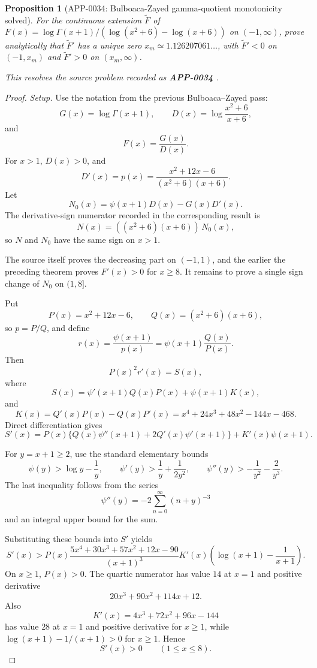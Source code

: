 \documentclass[11pt]{article}
\numberwithin{equation}{section}
\newtheorem{proposition}[theorem]{Proposition}
\theoremstyle{definition}
\theoremstyle{remark}
\newcommand{\1}{\mathbf 1}
\begin{document}
\begin{proposition}[APP-0034: Bulboaca-Zayed gamma-quotient monotonicity solved]
\label{res:bulboaca-zayed-gamma-quotient-full-monotonicity}
For the continuous extension \(\widetilde F\) of \(F(x)=\log\Gamma(x+1)/(\log(x^2+6)-\log(x+6))\) on \((-1,\infty)\), prove analytically that \(\widetilde F'\) has a unique zero \(x_m\simeq1.126207061\ldots\), with \(\widetilde F'<0\) on \((-1,x_m)\) and \(\widetilde F'>0\) on \((x_m,\infty)\).

This resolves the source problem recorded as \textbf{APP-0034} \cite{bulboaca-zayed-gamma}.
\end{proposition}

\begin{proof}
\emph{Setup.}
Use the notation from the previous Bulboaca--Zayed pass:
\[
G(x)=\log\Gamma(x+1),\qquad
D(x)=\log\frac{x^2+6}{x+6},
\]
and
\[
F(x)=\frac{G(x)}{D(x)}.
\]
For \(x>1\), \(D(x)>0\), and
\[
D'(x)=p(x)=\frac{x^2+12x-6}{(x^2+6)(x+6)}.
\]
Let
\[
N_0(x)=\psi(x+1)D(x)-G(x)D'(x).
\]
The derivative-sign numerator recorded in
the corresponding result is
\[
N(x)=((x^2+6)(x+6))\,N_0(x),
\]
so \(N\) and \(N_0\) have the same sign on \(x>1\).

The source itself proves the decreasing part on \((-1,1)\), and the earlier
the preceding theorem proves \(F'(x)>0\) for
\(x\ge8\).  It remains to prove a single sign change of \(N_0\) on \((1,8]\).

Put
\[
P(x)=x^2+12x-6,\qquad Q(x)=(x^2+6)(x+6),
\]
so \(p=P/Q\), and define
\[
r(x)=\frac{\psi(x+1)}{p(x)}=\psi(x+1)\frac{Q(x)}{P(x)}.
\]
Then
\[
P(x)^2r'(x)=S(x),
\]
where
\[
S(x)=\psi'(x+1)Q(x)P(x)+\psi(x+1)K(x),
\]
and
\[
K(x)=Q'(x)P(x)-Q(x)P'(x)
=x^4+24x^3+48x^2-144x-468.
\]
Direct differentiation gives
\[
S'(x)=P(x)\{Q(x)\psi''(x+1)+2Q'(x)\psi'(x+1)\}+K'(x)\psi(x+1).
\]

For \(y=x+1\ge2\), use the standard elementary bounds
\[
\psi(y)>\log y-\frac1y,\qquad
\psi'(y)>\frac1y+\frac{1}{2y^2},\qquad
\psi''(y)>-\frac1{y^2}-\frac2{y^3}.
\]
The last inequality follows from the series
\[
\psi''(y)=-2\sum_{n=0}^{\infty}(n+y)^{-3}
\]
and an integral upper bound for the sum.

Substituting these bounds into \(S'\) yields
\[
S'(x)>
P(x)\frac{5x^4+30x^3+57x^2+12x-90}{(x+1)^3}
K'(x)\left(\log(x+1)-\frac1{x+1}\right).
\]
On \(x\ge1\), \(P(x)>0\).  The quartic numerator has value \(14\) at \(x=1\)
and positive derivative
\[
20x^3+90x^2+114x+12.
\]
Also
\[
K'(x)=4x^3+72x^2+96x-144
\]
has value \(28\) at \(x=1\) and positive derivative for \(x\ge1\), while
\(\log(x+1)-1/(x+1)>0\) for \(x\ge1\).  Hence
\[
S'(x)>0\qquad(1\le x\le8).
\]


\end{proof}
\end{document}
